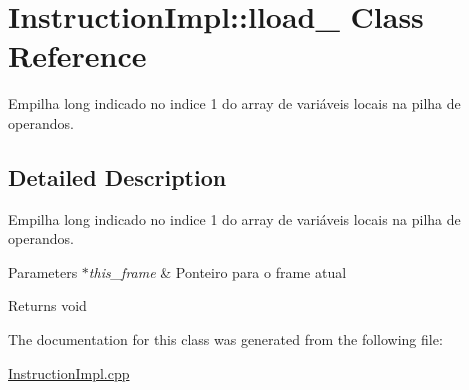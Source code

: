 \hypertarget{class_instruction_impl_1_1lload__1}{}\section{Instruction\+Impl\+:\+:lload\+\_ Class Reference}
\label{class_instruction_impl_1_1lload__1}


Empilha long indicado no indice 1 do array de variáveis locais na pilha de operandos.  




\subsection{Detailed Description}
Empilha long indicado no indice 1 do array de variáveis locais na pilha de operandos. 


\begin{DoxyParams}{Parameters}
{\em $\ast$this\+\_\+frame} & Ponteiro para o frame atual \\
\hline
\end{DoxyParams}
\begin{DoxyReturn}{Returns}
void 
\end{DoxyReturn}


The documentation for this class was generated from the following file\+:\begin{DoxyCompactItemize}
\item 
\hyperlink{_instruction_impl_8cpp}{Instruction\+Impl.\+cpp}\end{DoxyCompactItemize}
